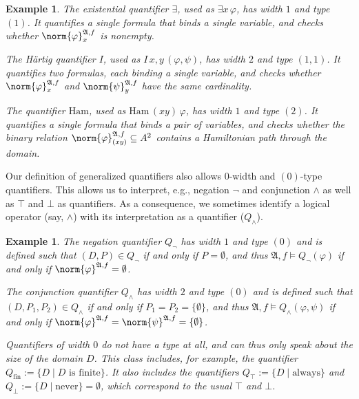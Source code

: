 \documentclass{article}
\newtheorem{example}[theorem]{Example}
\theoremstyle{definition}
\begin{document}
\begin{example}
    The existential quantifier $\exists$, used as $\exists x \, \varphi$, has width $1$ and type $(1)$. It quantifies a single formula that binds a single variable, and checks whether $\norm{\varphi}^{\mathfrak{A},f}_x$ is nonempty.

    The Härtig quantifier $I$, used as $I\, x,y \,  (\varphi,\psi)$, has width $2$ and type $(1,1)$. It quantifies two formulas, each binding a single variable, and checks whether $\norm{\varphi}^{\mathfrak{A},f}_{x}$ and $\norm{\psi}^{\mathfrak{A},f}_{y}$ have the same cardinality.

    The quantifier $\mathrm{Ham}$, used as $\mathrm{Ham}\, (xy)\, \varphi$, has width $1$ and type $(2)$. It quantifies a single formula that binds a pair of variables, and checks whether the binary relation $\norm{\varphi}^{\mathfrak{A},f}_{(xy)}\subseteq A^2$ contains a Hamiltonian path through the domain.
\end{example}

Our definition of generalized quantifiers also allows $0$-width and $(0)$-type quantifiers. This allows us to interpret, e.g., negation $\neg$ and conjunction $\land$ as well as $\top$ and $\bot$ as quantifiers. As a consequence, we sometimes identify a logical operator (say, $\land$) with its interpretation as a quantifier ($Q_\land$).

\begin{example}
    The negation quantifier $Q_\neg$ has width $1$ and type $(0)$ and is defined such that $(D,P)\in Q_\neg$ if and only if $P=\emptyset$, and thus $\mathfrak{A},f\models Q_\neg(\varphi)$ if and only if $\norm{\varphi}^{\mathfrak{A},f}=\emptyset$.
    
    The conjunction quantifier $Q_\land$ has width $2$ and type $(0)$ and is defined such that $(D,P_1,P_2)\in Q_\land$ if and only if $P_1=P_2=\{\emptyset\}$, and thus $\mathfrak{A},f\models Q_\land(\varphi,\psi)$ if and only if $\norm{\varphi}^{\mathfrak{A},f}=\norm{\psi}^{\mathfrak{A},f}=\{\emptyset\}$.
    
    Quantifiers of width $0$ do not have a type at all, and can thus only speak about the size of the domain $D$. This class includes, for example, the quantifier $Q_\text{fin}:=\{D\mid D \text{ is finite}\}$. It also includes the quantifiers $Q_\top:=\{D\mid \text{always}\}$ and $Q_\bot:=\{D\mid \text{never}\}=\emptyset$, which correspond to the usual $\top$ and $\bot$.
\end{example}
\end{document}
